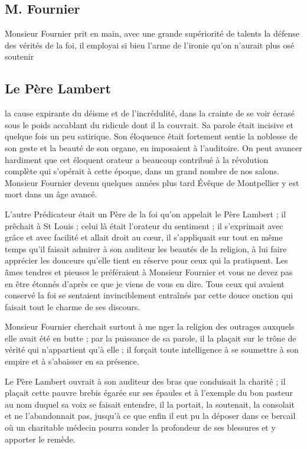 \documentclass[11pt,a4paper]{report}
\begin{document}
\subsection*{M. Fournier}

Monsieur Fournier prit en main, avec une grande supériorité de talents la défense des vérités de la foi, il employai si bien l'arme de l'ironie qu'on n'aurait plus osé soutenir

\subsection*{Le Père Lambert}

la cause expirante du déisme et de l'incrédulité, dans la crainte de se voir écrasé sous le poids accablant du ridicule dont il la couvrait. Sa parole était incisive et quelque fois un peu satirique. Son éloquence était fortement sentie la noblesse de son geste et la beauté de son organe, en imposaient à l'auditoire. On peut avancer hardiment que cet éloquent orateur a beaucoup contribué à la révolution complète qui s'opérait à cette époque, dans un grand nombre de nos salons. Monsieur Fournier devenu quelques années plus tard Évêque de Montpellier y est mort dans un âge avancé.

L'autre Prédicateur était un Père de la foi qu'on appelait le Père Lambert ; il prêchait à St Louis ; celui là était l'orateur du sentiment ; il s'exprimait avec grâce et avec facilité et allait droit au cœur, il s'appliquait sur tout en même temps qu'il faisait admirer à son auditeur les beautés de la religion, à lui faire apprécier les douceurs qu'elle tient en réserve pour ceux qui la pratiquent. Les âmes tendres et pieuses le préféraient à Monsieur Fournier et vous ne devez pas en être étonnés d'après ce que je viens de vous en dire. Tous ceux qui avaient conservé la foi se sentaient invinciblement entraînés par cette douce onction qui faisait tout le charme de ses discours.

Monsieur Fournier cherchait surtout à me nger la religion des outrages auxquels elle avait été en butte ; par la puissance de sa parole, il la plaçait sur le trône de vérité qui n'appartient qu'à elle ; il forçait toute intelligence à se soumettre à son empire et à s'abaisser en sa présence.

Le Père Lambert ouvrait à son auditeur des bras que conduisait la charité ; il plaçait cette pauvre brebis égarée sur ses épaules et à l'exemple du bon pasteur au nom duquel sa voix se faisait entendre, il la portait, la soutenait, la consolait et ne l'abandonnait pas, jusqu'à ce que enfin il eut pu la déposer dans ce bercail où un charitable médecin pourra sonder la profondeur de ses blessures et y apporter le remède.
\end{document}
